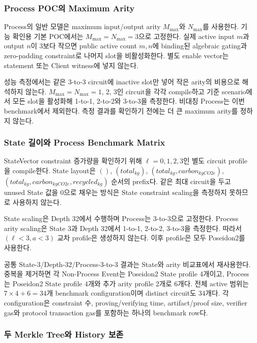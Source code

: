 \documentclass[11pt]{extarticle}
\begin{document}
\subsubsection{Process POC의 Maximum Arity}

Process의 일반 모델은 maximum input/output arity $M_{\max}$와 $N_{\max}$를 사용한다.
기능 확인용 기본 POC에서는 $M_{\max}=N_{\max}=3$으로 고정한다. 실제 active input $m$과 output $n$이
3보다 작으면 public active count $m,n$에 binding된 algebraic gating과 zero-padding
constraint로 나머지 slot을 비활성화한다. 별도 enable vector는 statement 또는 Client
witness에 넣지 않는다.

성능 측정에서는 같은 3-to-3 circuit에 inactive slot만 넣어 작은 arity의 비용으로 해석하지
않는다. $M_{\max}=N_{\max}=1$, 2, 3인 circuit을 각각 compile하고 기준 scenario에서
모든 slot을 활성화해 1-to-1, 2-to-2와 3-to-3을 측정한다. 비대칭 Process는 이번
benchmark에서 제외한다. 측정 결과를 확인하기 전에는 더 큰 maximum arity를 정하지 않는다.

\subsubsection{State 길이와 Process Benchmark Matrix}

StateVector constraint 증가량을 확인하기 위해 $\ell=0,1,2,3$인 별도 circuit profile을
compile한다. State layout은
$()$, $(total_{kg})$, $(total_{kg},carbon_{kgCO2e})$,
$(total_{kg},carbon_{kgCO2e},recycled_{kg})$ 순서의 prefix다. 같은 최대 circuit을 두고
unused State 값을 0으로 채우는 방식은 State constraint scaling을 측정하지 못하므로 사용하지
않는다.

State scaling은 Depth 32에서 수행하며 Process는 3-to-3으로 고정한다. Process arity
scaling은 State 3과 Depth 32에서 1-to-1, 2-to-2, 3-to-3을 측정한다.
따라서 $(\ell<3,a<3)$ 교차 profile은 생성하지 않는다. 이후 profile은 모두
Poseidon2를 사용한다.

공통 State-3/Depth-32/Process-3-to-3 결과는 State와 arity 비교표에서 재사용한다.
중복을 제거하면 각 Non-Process Event는 Poseidon2 State profile 4개이고,
Process는 Poseidon2 State profile 4개와 추가 arity profile 2개로 6개다.
전체 active 범위는 $7\times4+6=34$개 benchmark configuration이며 distinct circuit도
34개다. 각 configuration은 constraint 수,
proving/verifying time, artifact/proof size,
verifier gas와 protocol transaction gas를 포함하는 하나의 benchmark row다.

\subsubsection{두 Merkle Tree와 History 보존}
\end{document}

